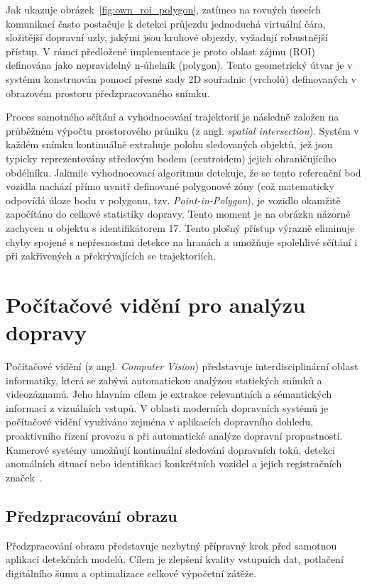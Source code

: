 \documentclass[male,czech,api_bc]{kitheses}
\begin{document}
Jak ukazuje obrázek~\ref{fig:own_roi_polygon}, zatímco na rovných úsecích komunikací často postačuje k detekci průjezdu jednoduchá virtuální čára, složitější dopravní uzly, jakými jsou kruhové objezdy, vyžadují robustnější přístup. V rámci předložené implementace je proto oblast zájmu (\acs{ROI}) definována jako nepravidelný n-úhelník (polygon). Tento geometrický útvar je v systému konstruován pomocí přesné sady 2D souřadnic (vrcholů) definovaných v obrazovém prostoru předzpracovaného snímku.

Proces samotného sčítání a vyhodnocování trajektorií je následně založen na průběžném výpočtu prostorového průniku (z angl. \textit{spatial intersection}). Systém v každém snímku kontinuálně extrahuje polohu sledovaných objektů, jež jsou typicky reprezentovány středovým bodem (centroidem) jejich ohraničujícího obdélníku. Jakmile vyhodnocovací algoritmus detekuje, že se tento referenční bod vozidla nachází přímo uvnitř definované polygonové zóny (což matematicky odpovídá úloze bodu v polygonu, tzv. \textit{Point-in-Polygon}), je vozidlo okamžitě započítáno do celkové statistiky dopravy. Tento moment je na obrázku názorně zachycen u objektu s identifikátorem 17. Tento plošný přístup výrazně eliminuje chyby spojené s nepřesnostmi detekce na hranách a umožňuje spolehlivé sčítání i při zakřivených a překrývajících se trajektoriích.


\section{Počítačové vidění pro analýzu dopravy}
Počítačové vidění (z angl. \textit{Computer Vision}) představuje interdisciplinární oblast informatiky, která se zabývá automatickou analýzou statických snímků a videozáznamů. Jeho hlavním cílem je extrakce relevantních a sémantických informací z vizuálních vstupů. V oblasti moderních dopravních systémů je počítačové vidění využíváno zejména v aplikacích dopravního dohledu, proaktivního řízení provozu a při automatické analýze dopravní propustnosti. Kamerové systémy umožňují kontinuální sledování dopravních toků, detekci anomálních situací nebo identifikaci konkrétních vozidel a jejich registračních značek~\cite{szeliski_computer_vision, zhou_traffic_survey_2024}.

\subsection{Předzpracování obrazu}
Předzpracování obrazu představuje nezbytný přípravný krok před samotnou aplikací detekčních modelů. Cílem je zlepšení kvality vstupních dat, potlačení digitálního šumu a optimalizace celkové výpočetní zátěže. 
\end{document}
